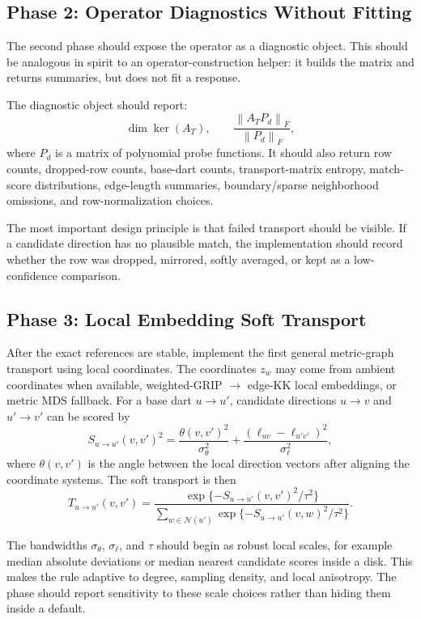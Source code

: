 \documentclass[11pt]{article}
\newcommand{\N}{\mathcal N}
\newcommand{\norm}[1]{\left\lVert #1 \right\rVert}
\begin{document}
\subsection{Phase 2: Operator Diagnostics Without Fitting}

The second phase should expose the operator as a diagnostic object.  This
should be analogous in spirit to an operator-construction helper: it builds
the matrix and returns summaries, but does not fit a response.

The diagnostic object should report:
\[
  \dim\ker(A_T),
  \qquad
  \frac{\norm{A_TP_d}_F}{\norm{P_d}_F},
\]
where \(P_d\) is a matrix of polynomial probe functions.  It should also
return row counts, dropped-row counts, base-dart counts, transport-matrix
entropy, match-score distributions, edge-length summaries, boundary/sparse
neighborhood omissions, and row-normalization choices.

The most important design principle is that failed transport should be visible.
If a candidate direction has no plausible match, the implementation should
record whether the row was dropped, mirrored, softly averaged, or kept as a
low-confidence comparison.

\subsection{Phase 3: Local Embedding Soft Transport}

After the exact references are stable, implement the first general metric-graph
transport using local coordinates.  The coordinates \(z_w\) may come from
ambient coordinates when available, weighted-GRIP \(\to\) edge-KK local
embeddings, or metric MDS fallback.  For a base dart \(u\to u'\), candidate
directions \(u\to v\) and \(u'\to v'\) can be scored by
\[
  S_{u\to u'}(v,v')^2
  =
  \frac{\theta(v,v')^2}{\sigma_\theta^2}
  +
  \frac{(\ell_{uv}-\ell_{u'v'})^2}{\sigma_\ell^2},
\]
where \(\theta(v,v')\) is the angle between the local direction vectors after
aligning the coordinate systems.  The soft transport is then
\[
  T_{u\to u'}(v,v')
  =
  \frac{\exp\{-S_{u\to u'}(v,v')^2/\tau^2\}}
       {\sum_{w\in\N(u')}\exp\{-S_{u\to u'}(v,w)^2/\tau^2\}}.
\]

The bandwidths \(\sigma_\theta\), \(\sigma_\ell\), and \(\tau\) should begin as
robust local scales, for example median absolute deviations or median nearest
candidate scores inside a disk.  This makes the rule adaptive to degree,
sampling density, and local anisotropy.  The phase should report sensitivity to
these scale choices rather than hiding them inside a default.
\end{document}
